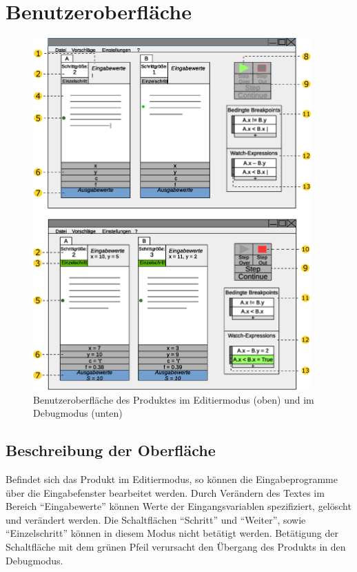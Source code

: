 \documentclass[parskip=full]{scrartcl}
\begin{document}
	
\newpage
\section{Benutzeroberfläche}
\begin{figure}[!ht] 
    \vspace{-10pt}
    \centering
       \includegraphics[width=0.95\textwidth]{skizzeFull_v2.eps}
       \caption{
         Benutzeroberfläche des Produktes im Editiermodus (oben) und im Debugmodus
         (unten)
       }
    \label{fig:Bild4}
\end{figure}

\newpage
    \subsection{Beschreibung der Oberfläche}
        Befindet sich das Produkt im \gls{Editiermodus}, so können die Eingabeprogramme über die 
        Eingabefenster bearbeitet werden.
        Durch Verändern des Textes im Bereich \enquote{Eingabewerte} können Werte der Eingangsvariablen
        spezifiziert, gelöscht und verändert werden. 
        Die Schaltflächen \enquote{\gls{Schritt}} und \enquote{Weiter}, sowie \enquote{\gls{Einzelschritt}} können in diesem Modus nicht betätigt
        werden. Betätigung der Schaltfläche mit dem grünen Pfeil verursacht den Übergang des Produkts in den Debugmodus.
        
\end{document}
